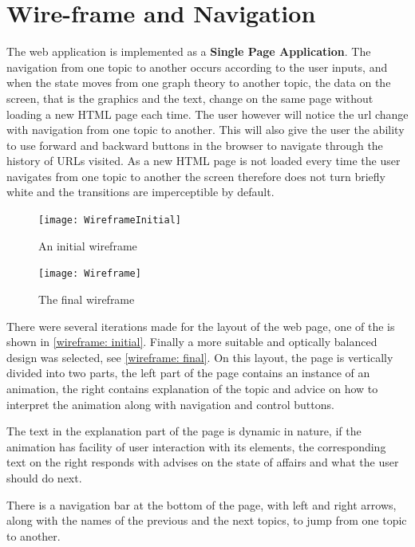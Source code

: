 \section{Wire-frame and Navigation}
The web application is implemented as a \textbf{Single Page Application}. The navigation
from one topic to another occurs according to the user inputs, and when the state
moves from one graph theory to another topic, the data on the screen, that is
the graphics and the text, change on the same page without loading a new HTML page
each time. The user however will notice the url change with navigation from one
topic to another. This will also give the user the ability to use forward and
backward buttons in the browser to navigate through the history of URLs
visited. As a new HTML page is not loaded every time the user navigates from
one topic to another the screen therefore does not turn briefly white and the
transitions are imperceptible by default.

\begin{figure}[H]
    \centering
    \begin{minipage}{.5\textwidth}
        \centering
        \texttt{[image: WireframeInitial]}
        \caption{An initial wireframe}
        \label{fig:pubsub1}
    \end{minipage}%
    \begin{minipage}{.5\textwidth}
        \centering
        \texttt{[image: Wireframe]}
        \caption{The final wireframe}
        \label{fig:pubsub2}
    \end{minipage}
\end{figure}

There were several iterations made for the layout of the web page, one of the
is shown in \autoref{wireframe: initial}. Finally a more suitable and optically balanced design was selected, see
\autoref{wireframe: final}. On this layout, the page is vertically divided into two
parts, the left part of the page contains an instance of an animation, the
right contains explanation of the topic and advice on how to interpret the
animation along with navigation and control buttons. 

The text in the explanation part of the page is dynamic in nature, if the
animation has facility of user interaction with its elements, the
corresponding text on the right responds with advises on the state of affairs
and what the user should do next.

There is a navigation bar at the bottom of the page, with left and right
arrows, along with the names of the previous and the next topics, to jump from
one topic to another.


